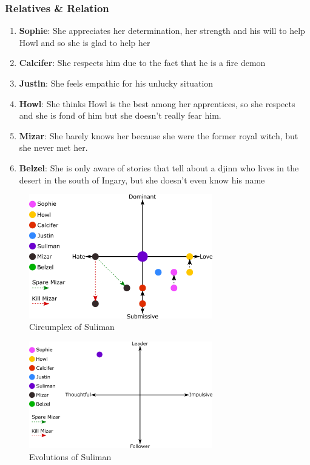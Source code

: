 \subsubsection*{Relatives \& Relation}
\begin{enumerate}
\item \textbf{Sophie}: She appreciates her determination, her strength and his will to help Howl and so she is glad to help her
\item \textbf{Calcifer}: She respects him due to the fact that he is a fire demon
\item \textbf{Justin}: She feels empathic for his unlucky situation
\item \textbf{Howl}: She thinks Howl is the best among her apprentices, so she respects and she is fond of him but she doesn't really  fear him.
\item \textbf{Mizar}: She barely knows her because she were the former royal witch, but she never met her.
\item \textbf{Belzel}: She is only aware of stories that tell about a djinn who lives in the desert in the south of Ingary, but she doesn't even know his name
\end{enumerate}

\begin{figure}[H]
  \centering
  \includegraphics[width=8cm]{Images/SVG/Exported/Circumplexes/sulimanCircumplex}
  \caption{Circumplex of Suliman}
\end{figure}

\begin{figure}[H]
  \centering
   \includegraphics[width=8cm]{Images/SVG/Exported/Evolutions/sulimanEvolution}
  \caption{Evolutions of Suliman}
\end{figure}

